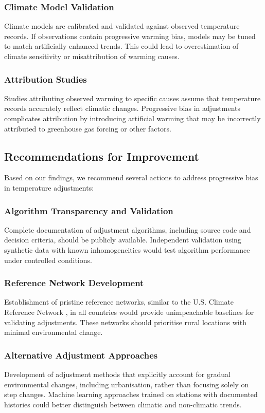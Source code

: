 \documentclass[11pt, a4paper]{article}
\begin{document}
\subsubsection{Climate Model Validation}
Climate models are calibrated and validated against observed temperature records. If observations contain progressive warming bias, models may be tuned to match artificially enhanced trends. This could lead to overestimation of climate sensitivity or misattribution of warming causes.

\subsubsection{Attribution Studies}
Studies attributing observed warming to specific causes assume that temperature records accurately reflect climatic changes. Progressive bias in adjustments complicates attribution by introducing artificial warming that may be incorrectly attributed to greenhouse gas forcing or other factors.

\subsection{Recommendations for Improvement}

Based on our findings, we recommend several actions to address progressive bias in temperature adjustments:

\subsubsection{Algorithm Transparency and Validation}
Complete documentation of adjustment algorithms, including source code and decision criteria, should be publicly available. Independent validation using synthetic data with known inhomogeneities would test algorithm performance under controlled conditions.

\subsubsection{Reference Network Development}
Establishment of pristine reference networks, similar to the U.S. Climate Reference Network \parencite{diamond2013uscrn}, in all countries would provide unimpeachable baselines for validating adjustments. These networks should prioritise rural locations with minimal environmental change.

\subsubsection{Alternative Adjustment Approaches}
Development of adjustment methods that explicitly account for gradual environmental changes, including urbanisation, rather than focusing solely on step changes. Machine learning approaches trained on stations with documented histories could better distinguish between climatic and non-climatic trends.
\end{document}

